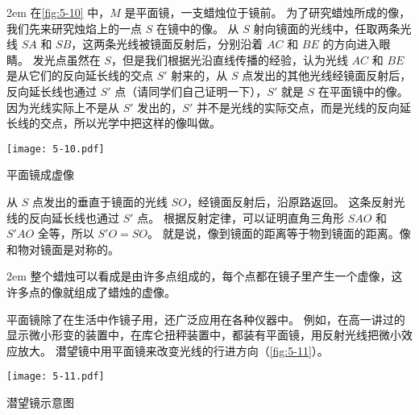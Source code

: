 \medskip\noindent
\begin{minipage}{0.7\linewidth}\parindent2em
在\cref{fig:5-10} 中，$M$ 是平面镜，一支蜡烛位于镜前。
为了研究蜡烛所成的像，我们先来研究烛焰上的一点 $S$ 在镜中的像。
从 $S$ 射向镜面的光线中，任取两条光线 $SA$ 和 $SB$，这两条光线被镜面反射后，分别沿着 $AC$ 和 $BE$ 的方向进入眼睛。
发光点虽然在 $S$，但是我们根据光沿直线传播的经验，认为光线 $AC$ 和 $BE$ 是从它们的反向延长线的交点 $S'$ 射来的，从 $S$ 点发出的其他光线经镜面反射后，反向延长线也通过 $S'$ 点（请同学们自己证明一下），$S'$ 就是 $S$ 在平面镜中的像。
因为光线实际上不是从 $S'$ 发出的，$S'$ 并不是光线的实际交点，而是光线的反向延长线的交点，所以光学中把这样的像叫做。
\end{minipage}\hfill
\begin{minipage}{0.25\linewidth}
  \begin{figurehere}
    \texttt{[image: 5-10.pdf]}
    \caption{平面镜成虚像}\label{fig:5-10}
  \end{figurehere}
\end{minipage}

\medskip
从 $S$ 点发出的垂直于镜面的光线 $SO$，经镜面反射后，沿原路返回。
这条反射光线的反向延长线也通过 $S'$ 点。
根据反射定律，可以证明直角三角形 $SAO$ 和 $S'AO$ 全等，所以 $S'O=SO$。
就是说，像到镜面的距离等于物到镜面的距离。像和物对镜面是对称的。

\medskip\noindent 
\begin{minipage}{0.6\linewidth}\parindent2em
整个蜡烛可以看成是由许多点组成的，每个点都在镜子里产生一个虚像，这许多点的像就组成了蜡烛的虚像。

平面镜除了在生活中作镜子用，还广泛应用在各种仪器中。
例如，在高一讲过的显示微小形变的装置中，在库仑扭秤装置中，都装有平面镜，用反射光线把微小效应放大。
潜望镜中用平面镜来改变光线的行进方向（\cref{fig:5-11}）。
\end{minipage}\hfill
\begin{minipage}{0.35\linewidth}
\begin{figurehere}
  \texttt{[image: 5-11.pdf]}
  \caption{潜望镜示意图}\label{fig:5-11}
\end{figurehere}
\end{minipage}\par\medskip


